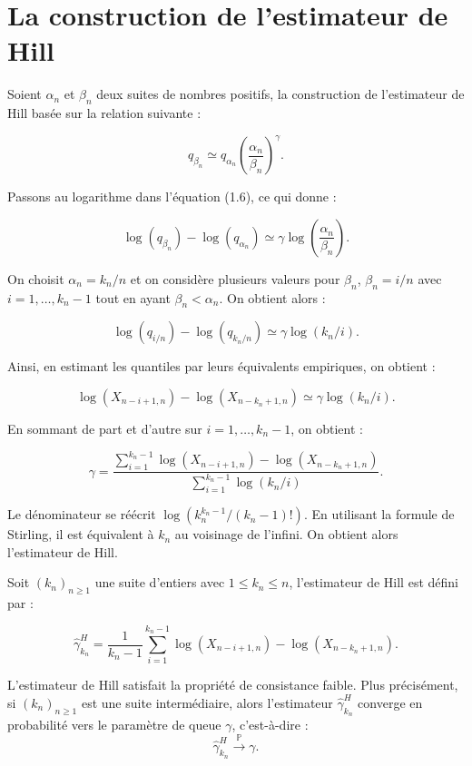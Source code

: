 \documentclass{article}
\theoremstyle{plain}
\theoremstyle{definition}
\theoremstyle{plain}
\begin{document}
\section{La construction de l’estimateur de Hill}

Soient $\alpha_n$ et $\beta_n$ deux suites de nombres positifs, la construction de l’estimateur de Hill basée sur la relation suivante :

\begin{equation}
    q_{\beta_n} \simeq q_{\alpha_n} \left( \frac{\alpha_n}{\beta_n} \right)^{\gamma}.
    \tag{1.6}
\end{equation}

Passons au logarithme dans l’équation (1.6), ce qui donne :

\[
\log(q_{\beta_n}) - \log(q_{\alpha_n}) \simeq \gamma \log\left( \frac{\alpha_n}{\beta_n} \right).
\]

On choisit $\alpha_n = k_n/n$ et on considère plusieurs valeurs pour $\beta_n$, $\beta_n = i/n$ avec $i = 1, \ldots, k_n - 1$ tout en ayant $\beta_n < \alpha_n$. On obtient alors :

\[
\log(q_{i/n}) - \log(q_{k_n/n}) \simeq \gamma \log(k_n/i).
\]

Ainsi, en estimant les quantiles par leurs équivalents empiriques, on obtient :

\[
\log(X_{n - i + 1, n}) - \log(X_{n - k_n + 1, n}) \simeq \gamma \log(k_n / i).
\]

En sommant de part et d’autre sur $i = 1, \ldots, k_n - 1$, on obtient :

\[
\gamma = \frac{\displaystyle \sum_{i=1}^{k_n - 1} \log(X_{n - i + 1, n}) - \log(X_{n - k_n + 1, n})}{\displaystyle \sum_{i=1}^{k_n - 1} \log(k_n / i)}.
\]

Le dénominateur se réécrit $\log(k_n^{k_n - 1}/(k_n - 1)!)$. En utilisant la formule de Stirling, il est équivalent à $k_n$ au voisinage de l’infini. On obtient alors l’estimateur de Hill.

Soit $(k_n)_{n \geq 1}$ une suite d'entiers avec $1 \leq k_n \leq n$, l’estimateur de Hill est défini par :

\[
\hat{\gamma}^{H}_{k_n} = \frac{1}{k_n - 1} \sum_{i=1}^{k_n - 1} \log(X_{n - i + 1, n}) - \log(X_{n - k_n + 1, n}).
\]

L’estimateur de Hill satisfait la propriété de consistance faible. Plus précisément, si $(k_n)_{n \geq 1}$ est une suite intermédiaire, alors l’estimateur $\hat{\gamma}^{H}_{k_n}$ converge en probabilité vers le paramètre de queue $\gamma$, c’est-à-dire :
\[
\hat{\gamma}^{H}_{k_n} \xrightarrow{\mathbb{P}} \gamma.
\]
\end{document}

